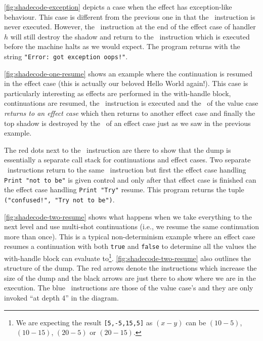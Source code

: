 \documentclass[class=article, crop=false]{standalone}
\begin{document}
\autoref{fig:shadecode-exception} depicts a case when the effect has
exception-like behaviour. This case is different from the previous one in that
the \vmKillShadow\ instruction is never executed. However, the \vmRett\
instruction at the end of the effect case of handler $h$ will still destroy the
shadow and return to the \vmFin\ instruction which is executed before the
machine halts as we would expect. The program returns with the string \lstinline|"Error: got exception oops!"|.

\autoref{fig:shadecode-one-resume} shows an example where the continuation is
resumed in the effect case (this is actually our beloved Hello World again!).
This case is particularly interesting as effects are performed in the
with-handle block, continuations are resumed, the \vmKillShadow\ instruction is
executed and the \vmRett\ of the value case \emph{returns to an effect case}
which then returns to another effect case and finally the top shadow is
destroyed by the \vmRett\ of an effect case just as we saw in the previous
example.

The red dots next to the \vmApply\ instruction are there to show that the dump
is essentially a separate call stack for continuations and effect cases.
Two separate \vmRett\ instructions return to the same \vmApply\ instruction
but first the effect case handling \lstinline{Print "not to be"} is given
control and only after that effect case is finished can the effect case handling
\lstinline{Print "Try"} resume. This program returns the tuple
\lstinline|("confused!", "Try not to be")|.

 

\autoref{fig:shadecode-two-resume} shows what happens when we take everything to
the next level and use multi-shot continuations (i.e., we resume the same
continuation more than once). This is a typical non-determinism example where
an effect case resumes a continuation with both \lstinline{true} and
\lstinline{false} to determine all the values the with-handle block can evaluate
to\footnote{We are expecting the result \lstinline{[5,-5,15,5]} as $(x-y)$
can be $(10-5)$, $(10-15)$, $(20-5)$ or $(20-15)$.}.
\autoref{fig:shadecode-two-resume} also outlines the structure of the dump.
The red arrows denote the instructions which increase the size of the dump and
the black arrows are just there to show where we are in the execution.
The blue \vmRett\ instructions are those of the value case's and they are only
invoked ``at depth 4'' in the diagram.
\end{document}
